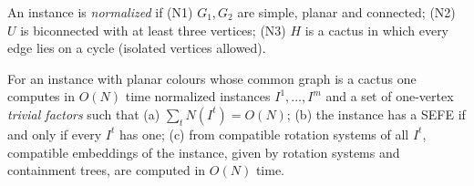 \begin{definition}\label{def:v4-normalized}
An instance is \emph{normalized} if (N1) $G_1,G_2$ are simple, planar and
connected; (N2) $U$ is biconnected with at least three vertices; (N3) $H$ is
a cactus in which every edge lies on a cycle (isolated vertices allowed).
\end{definition}

\begin{theorem}\label{thm:v4-normalize}
For an instance with planar colours whose common graph is a cactus one
computes in $O(N)$ time normalized instances $I^1,\dots,I^m$ and a set of
one-vertex \emph{trivial factors} such that (a) $\sum_tN(I^t)=O(N)$; (b)
the instance has a SEFE if and only if every $I^t$ has one; (c) from
compatible rotation systems of all $I^t$, compatible embeddings of the
instance, given by rotation systems and containment trees, are computed in
$O(N)$ time.
\end{theorem}

